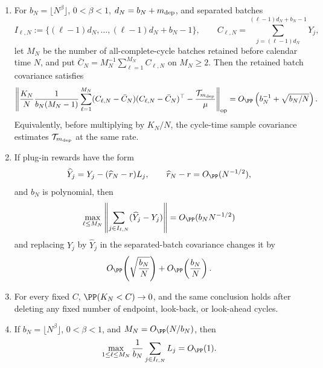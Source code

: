 \begin{proposition}
\begin{enumerate}[label=\textup{(\alph*)},leftmargin=2.4em,itemsep=0.25em]
\item For \(b_N=\lfloor N^\beta\rfloor\), \(0<\beta<1\),
\(d_N=b_N+m_{\rm dep}\), and separated batches
\[
I_{\ell,N}:=\{(\ell-1)d_N,\ldots,(\ell-1)d_N+b_N-1\},
\qquad
C_{\ell,N}=\sum_{j=(\ell-1)d_N}^{(\ell-1)d_N+b_N-1}Y_j ,
\]
let \(M_N\) be the number of all-complete-cycle batches retained before
calendar time \(N\), and put
\(\bar C_N=M_N^{-1}\sum_{\ell=1}^{M_N}C_{\ell,N}\) on \(M_N\ge2\).  Then the
retained batch covariance satisfies
\begin{equation}\label{eq:separated-batch-covariance-estimator-rate-main}
\left\|
\frac{K_N}{N}\frac1{b_N(M_N-1)}
\sum_{\ell=1}^{M_N}(C_{\ell,N}-\bar C_N)(C_{\ell,N}-\bar C_N)^\top
-\frac{\mathcal T_{m_{\rm dep}}}{\mu}
\right\|_{\operatorname{op}}
=O_{\PP}\left(b_N^{-1}+\sqrt{b_N/N}\right).
\end{equation}
Equivalently, before multiplying by \(K_N/N\), the cycle-time sample covariance
estimates \(\mathcal T_{m_{\rm dep}}\) at the same rate.

\item If plug-in rewards have the form
\[
\widehat Y_j=Y_j-(\widehat r_N-r)L_j,\qquad
\widehat r_N-r=O_{\PP}(N^{-1/2}),
\]
and \(b_N\) is polynomial, then
\begin{equation}\label{eq:separated-batch-plugin-block-main}
\max_{\ell\le M_N}
\left\|\sum_{j\in I_{\ell,N}}(\widehat Y_j-Y_j)\right\|
=O_{\PP}(b_NN^{-1/2})
\end{equation}
and replacing \(Y_j\) by \(\widehat Y_j\) in the separated-batch covariance
changes it by
\begin{equation}\label{eq:separated-batch-plugin-covariance-main}
O_{\PP}\!\left(\sqrt{\frac{b_N}{N}}\right)
+O_{\PP}\!\left(\frac{b_N}{N}\right).
\end{equation}

\item For every fixed \(C\), \(\PP(K_N<C)\to0\), and the same conclusion holds
after deleting any fixed number of endpoint, look-back, or look-ahead cycles.

\item If \(b_N=\lfloor N^\beta\rfloor\), \(0<\beta<1\), and
\(M_N=O_{\PP}(N/b_N)\), then
\begin{equation}\label{eq:uniform-calendar-block-length-main}
\max_{1\le \ell\le M_N}
\frac1{b_N}\sum_{j\in I_{\ell,N}}L_j
=O_{\PP}(1).
\end{equation}
\end{enumerate}
\end{proposition}

